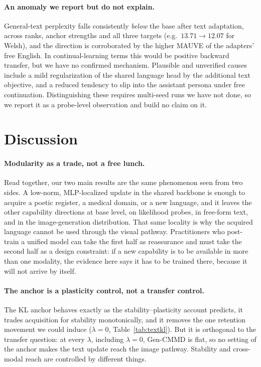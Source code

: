 \documentclass{article}
\begin{document}
\paragraph{An anomaly we report but do not explain.}
General-text perplexity falls consistently \emph{below} the base after text
adaptation, across ranks, anchor strengths and all three targets (e.g.\
$13.71\to12.07$ for Welsh), and the direction is corroborated by the higher
MAUVE of the adapters' free English. In continual-learning terms this would be
positive backward transfer, but we have no confirmed mechanism. Plausible and
unverified causes include a mild regularization of the shared language head by
the additional text objective, and a reduced tendency to slip into the assistant
persona under free continuation. Distinguishing these requires multi-seed runs
we have not done, so we report it as a probe-level observation and build no
claim on it.

\section{Discussion}
\paragraph{Modularity as a trade, not a free lunch.}
Read together, our two main results are the same phenomenon seen from two sides.
A low-norm, MLP-localized update in the shared backbone is enough to acquire a
poetic register, a medical domain, or a new language, and it leaves the other
capability directions at base level, on likelihood probes, in free-form text,
and in the image-generation distribution. That same locality is why the acquired
language cannot be used through the visual pathway. Practitioners who
post-train a unified model can take the first half as reassurance and must take
the second half as a design constraint: if a new capability is to be available
in more than one modality, the evidence here says it has to be trained there,
because it will not arrive by itself.

\paragraph{The anchor is a plasticity control, not a transfer control.}
The KL anchor behaves exactly as the stability--plasticity account predicts, it
trades acquisition for stability monotonically, and it removes the one retention
movement we could induce ($\lambda=0$, Table~\ref{tab:textkl}). But it is
orthogonal to the transfer question: at every $\lambda$, including $\lambda=0$,
Gen-CMMD is flat, so no setting of the anchor makes the text update reach the
image pathway. Stability and cross-modal reach are controlled by different
things.
\end{document}

